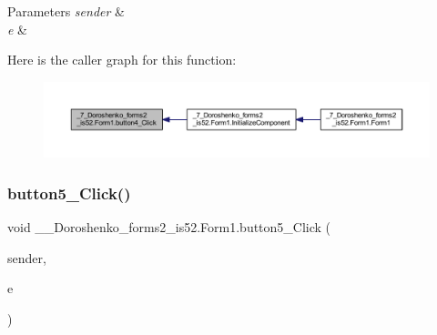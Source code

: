\begin{DoxyParams}{Parameters}
{\em sender} & \\
\hline
{\em e} & \\
\hline
\end{DoxyParams}
Here is the caller graph for this function\+:
\nopagebreak
\begin{figure}[H]
\begin{center}
\leavevmode
\includegraphics[width=350pt]{class__7___doroshenko__forms2__is52_1_1_form1_aed668b01be973700ab8589f694f9e0b9_icgraph}
\end{center}
\end{figure}
\hypertarget{class__7___doroshenko__forms2__is52_1_1_form1_a37aec70c8f5b1bf73b5e91b5f0311817}{}\label{class__7___doroshenko__forms2__is52_1_1_form1_a37aec70c8f5b1bf73b5e91b5f0311817} 
\subsubsection{\texorpdfstring{button5\+\_\+\+Click()}{button5\_Click()}}
{\footnotesize\ttfamily void \+\_\+\_\+\+Doroshenko\+\_\+forms2\+\_\+is52.\+Form1.\+button5\+\_\+\+Click (\begin{DoxyParamCaption}\item[{object}]{sender,  }\item[{Event\+Args}]{e }\end{DoxyParamCaption})\hspace{0.3cm}{\ttfamily [private]}}

